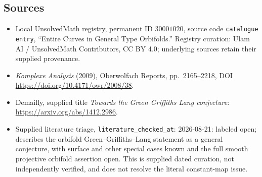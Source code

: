 \documentclass[11pt]{article}
\begin{document}
\subsection{Sources}
\begin{itemize}
\item Local UnsolvedMath registry, permanent ID \(30001020\), source code \texttt{catalogue entry}, ``Entire Curves in General Type Orbifolds.'' Registry curation: Ulam AI / UnsolvedMath Contributors, CC BY 4.0; underlying sources retain their supplied provenance.
\item \emph{Komplexe Analysis} (2009), Oberwolfach Reports, pp.\ 2165--2218, DOI \url{https://doi.org/10.4171/owr/2008/38}.
\item Demailly, supplied title \emph{Towards the Green Griffiths Lang conjecture}: \url{https://arxiv.org/abs/1412.2986}.
\item Supplied literature triage, \texttt{literature\_checked\_at}: 2026-08-21: labeled open; describes the orbifold Green--Griffiths--Lang statement as a general conjecture, with surface and other special cases known and the full smooth projective orbifold assertion open. This is supplied dated curation, not independently verified, and does not resolve the literal constant-map issue.
\end{itemize}
\end{document}
